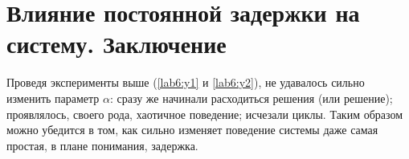 \clearpage
\section{Влияние постоянной задержки на систему. Заключение}

Проведя эксперименты выше (\ref{lab6:y1} и \ref{lab6:y2}),
не удавалось сильно изменить параметр $\alpha$: сразу же начинали расходиться
решения (или решение); проявлялось, своего рода, хаотичное поведение; исчезали циклы.
Таким образом можно убедится в том, как сильно изменяет поведение системы
даже самая простая, в плане понимания, задержка.
